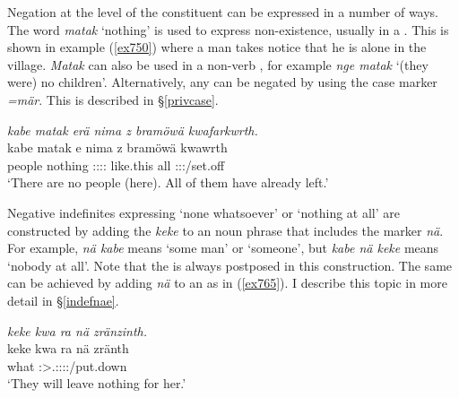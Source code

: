 Negation at the level of the constituent can be expressed in a number of ways. The word \emph{matak} `nothing' is used to express non-existence, usually in a  . This is shown in example (\ref{ex750}) where a man takes notice that he is alone in the village. \emph{Matak} can also be used in a non-verb , for example \emph{nge matak} `(they were) no children'. Alternatively, any  can be negated by using the  case marker \emph{=mär}. This is described in \S\ref{privcase}.

\begin{exe}
	\ex \emph{kabe matak erä nima z bramöwä kwafarkwrth.}\\
	\gll kabe matak e nima z bramöwä kwawrth\\
	people nothing \Stpl:\Sbj:\Nonpast:\Ipfv:\Cop{} like.this \Iam{} all \Stpl:\Sbj:\Rpst:\Ipfv/set.off\\
	\trans `There are no people (here). All of them have already left.'\\
	\label{ex750}
\end{exe}

Negative indefinites expressing `none whatsoever' or `nothing at all' are constructed by adding the  \emph{keke} to an noun phrase that includes the  marker \emph{nä}. For example, \emph{nä kabe} means `some man' or `someone', but \emph{kabe nä keke} means `nobody at all'. Note that the  is always postposed in this construction. The same can be achieved by adding \emph{nä} to an  as in (\ref{ex765}). I describe this topic in more detail in \S\ref{indefnae}.

\begin{exe}
	\ex \emph{keke kwa ra nä zränzinth.}\\
	\gll keke kwa ra nä zränth\\
	\Neg{} \Fut{} what \Indf{} \Stpl:\Sbj>\Tsg.\F:\Io:\Irr:\Pfv:\Venit/put.down\\
	\trans `They will leave nothing for her.'
	\label{ex765}
\end{exe}